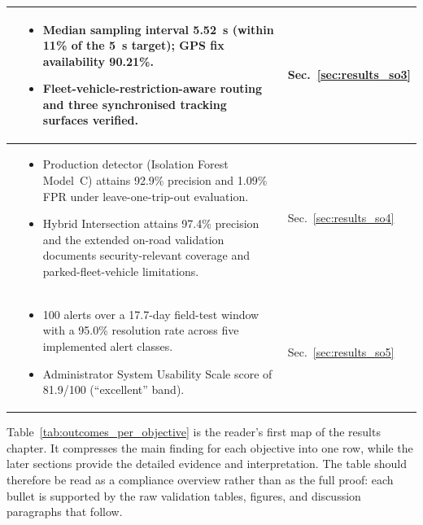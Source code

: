 \begin{center}
{\begin{tabularx}{\textwidth}{p{}|X|p{}}
			\Paste{SO3} &
			\begin{itemize}[leftmargin=*,nosep]
			    \item Median sampling interval 5.52~s (within 11\% of the 5~s target); GPS fix availability 90.21\%.
			    \item Fleet-vehicle-restriction-aware routing and three synchronised tracking surfaces verified.
			\end{itemize} & Sec.~\ref{sec:results_so3} \\ \hline

			\Paste{SO4} &
			\begin{itemize}[leftmargin=*,nosep]
			    \item Production detector (Isolation Forest Model~C) attains 92.9\% precision and 1.09\% FPR under leave-one-trip-out evaluation.
			    \item Hybrid Intersection attains 97.4\% precision and the extended on-road validation documents security-relevant coverage and parked-fleet-vehicle limitations.
			\end{itemize} & Sec.~\ref{sec:results_so4} \\ \hline

			\Paste{SO5} &
			\begin{itemize}[leftmargin=*,nosep]
			    \item 100 alerts over a 17.7-day field-test window with a 95.0\% resolution rate across five implemented alert classes.
			    \item Administrator System Usability Scale score of 81.9/100 (``excellent'' band).
			\end{itemize} & Sec.~\ref{sec:results_so5} \\ \hline

		\end{tabularx}
	}
\end{center}

Table~\ref{tab:outcomes_per_objective} is the reader's first map of the results chapter. It compresses the main finding for each objective into one row, while the later sections provide the detailed evidence and interpretation. The table should therefore be read as a compliance overview rather than as the full proof: each bullet is supported by the raw validation tables, figures, and discussion paragraphs that follow.

